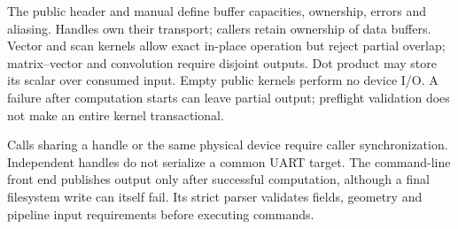 The public header and manual define buffer capacities, ownership, errors and
aliasing. Handles own their transport; callers retain ownership of data
buffers. Vector and scan kernels allow exact in-place operation but reject
partial overlap; matrix--vector and convolution require disjoint outputs.
Dot product may store its scalar over consumed input. Empty public kernels
perform no device I/O. A failure after computation starts can leave partial
output; preflight validation does not make an entire kernel transactional.

Calls sharing a handle or the same physical device require caller
synchronization. Independent handles do not serialize a common UART target.
The command-line front end publishes output only after successful computation,
although a final filesystem write can itself fail. Its strict parser validates
fields, geometry and pipeline input requirements before executing commands.
